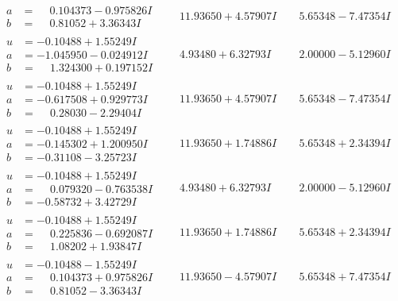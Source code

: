 \documentclass[1p]{elsarticle_modified}
\theoremstyle{definition}
\begin{document}
$$\begin{array}{c|c|c}
\begin{aligned}
a &= \phantom{-}0.104373 - 0.975826 I \\
b &= \phantom{-}0.81052 + 3.36343 I\end{aligned}
 & \phantom{-}11.93650 + 4.57907 I & \phantom{-}5.65348 - 7.47354 I \\ \hline\begin{aligned}
u &= -0.10488 + 1.55249 I \\
a &= -1.045950 - 0.024912 I \\
b &= \phantom{-}1.324300 + 0.197152 I\end{aligned}
 & \phantom{-}4.93480 + 6.32793 I & \phantom{-}2.00000 - 5.12960 I \\ \hline\begin{aligned}
u &= -0.10488 + 1.55249 I \\
a &= -0.617508 + 0.929773 I \\
b &= \phantom{-}0.28030 - 2.29404 I\end{aligned}
 & \phantom{-}11.93650 + 4.57907 I & \phantom{-}5.65348 - 7.47354 I \\ \hline\begin{aligned}
u &= -0.10488 + 1.55249 I \\
a &= -0.145302 + 1.200950 I \\
b &= -0.31108 - 3.25723 I\end{aligned}
 & \phantom{-}11.93650 + 1.74886 I & \phantom{-}5.65348 + 2.34394 I \\ \hline\begin{aligned}
u &= -0.10488 + 1.55249 I \\
a &= \phantom{-}0.079320 - 0.763538 I \\
b &= -0.58732 + 3.42729 I\end{aligned}
 & \phantom{-}4.93480 + 6.32793 I & \phantom{-}2.00000 - 5.12960 I \\ \hline\begin{aligned}
u &= -0.10488 + 1.55249 I \\
a &= \phantom{-}0.225836 - 0.692087 I \\
b &= \phantom{-}1.08202 + 1.93847 I\end{aligned}
 & \phantom{-}11.93650 + 1.74886 I & \phantom{-}5.65348 + 2.34394 I \\ \hline\begin{aligned}
u &= -0.10488 - 1.55249 I \\
a &= \phantom{-}0.104373 + 0.975826 I \\
b &= \phantom{-}0.81052 - 3.36343 I\end{aligned}
 & \phantom{-}11.93650 - 4.57907 I & \phantom{-}5.65348 + 7.47354 I \\ \hline\begin{aligned}

\end{aligned}
\end{array}$$
\end{document}
